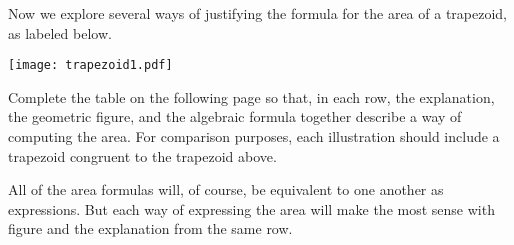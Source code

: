 \documentclass[nooutcomes,instructornotes]{ximera}
\begin{document}
\begin{problem}
Now we explore several ways of justifying the formula for the area of a trapezoid, as labeled below. 
\begin{image}
\texttt{[image: trapezoid1.pdf]}
\end{image}
Complete the table on the following page so that, in each row, the explanation, the geometric figure, and the algebraic formula together describe a way of computing the area.  For comparison purposes, each illustration should include a trapezoid congruent to the trapezoid above.   

All of the area formulas will, of course, be equivalent to one another as expressions.  But each way of expressing the area will make the most sense with figure and the explanation from the same row.  

\newpage


\newlength{\formulawidth}
\end{problem}
%
%
\newpage
\end{document}
